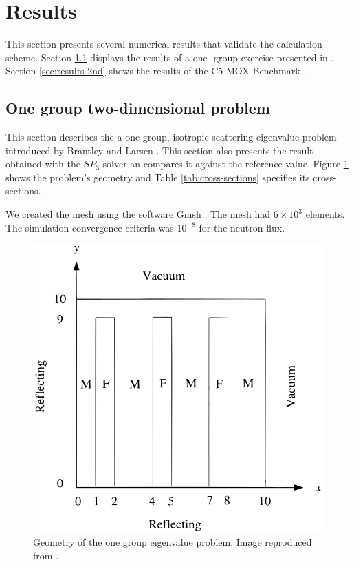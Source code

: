 \documentclass{anstrans}
\begin{document}
\section{Results}

This section presents several numerical results that validate the calculation scheme.
Section \ref{sec:results-1st} displays the results of a one- group exercise presented in \cite{brantley_simplifiedP3_2000}.
Section \ref{sec:results-2nd} shows the results of the C5 MOX Benchmark \cite{cavarec_benchmark_1994}.

\subsection{One group two-dimensional problem}
\label{sec:results-1st}

This section describes the a one group, isotropic-scattering eigenvalue problem introduced by Brantley and Larsen \cite{brantley_simplifiedP3_2000}.
This section also presents the result obtained with the $SP_3$ solver an compares it against the reference value.
Figure \ref{fig:2D} shows the problem's geometry and Table \ref{tab:cross-sections} specifies its cross-sections.

We created the mesh using the software Gmsh \cite{geuzaine_gmsh_2009}.
The mesh had $6 \times 10^{3}$ elements.
The simulation convergence criteria was $10^{-8}$ for the neutron flux.

\begin{figure}[htbp!] %
    \centering
    \includegraphics[width=0.9\linewidth]{figures/brantley-larsen.png}
    \hfill
    \caption{Geometry of the one group eigenvalue problem. Image reproduced from \cite{brantley_simplifiedP3_2000}.}
    \label{fig:2D}
\end{figure}
\end{document}
